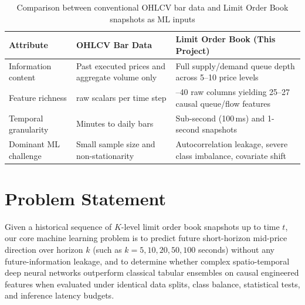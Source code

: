 \documentclass[12pt,a4paper,oneside]{report}
\begin{document}
\begin{table}[H]
\centering\small
\caption{Comparison between conventional OHLCV bar data and Limit Order Book snapshots as ML inputs}
\label{tab:ohlcv_vs_lob}
\begin{tabularx}{\linewidth}{@{}>{\raggedright\arraybackslash}p{3.0cm}>{\raggedright\arraybackslash}X>{\raggedright\arraybackslash}X@{}}
\toprule
\textbf{Attribute} & \textbf{OHLCV Bar Data} & \textbf{Limit Order Book (This Project)} \\
\midrule
Information content & Past executed prices and aggregate volume only & Full supply/demand queue depth across 5--10 price levels \\
Feature richness & 5 raw scalars per time step & 20--40 raw columns yielding 25--27 causal queue/flow features \\
Temporal granularity & Minutes to daily bars & Sub-second (100\,ms) and 1-second snapshots \\
Dominant ML challenge & Small sample size and non-stationarity & Autocorrelation leakage, severe class imbalance, covariate shift \\
\bottomrule
\end{tabularx}
\end{table}

\section{Problem Statement}

Given a historical sequence of $K$-level limit order book snapshots up to time $t$, our core machine learning problem is to predict future short-horizon mid-price direction over horizon $k$ (such as $k = 5, 10, 20, 50, 100$ seconds) without any future-information leakage, and to determine whether complex spatio-temporal deep neural networks outperform classical tabular ensembles on causal engineered features when evaluated under identical data splits, class balance, statistical tests, and inference latency budgets.
\end{document}
